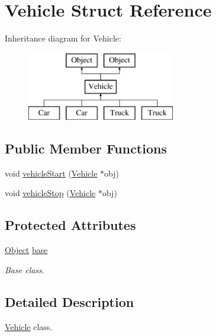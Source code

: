 \hypertarget{struct_vehicle}{}\section{Vehicle Struct Reference}
\label{struct_vehicle}
Inheritance diagram for Vehicle\+:\begin{figure}[H]
\begin{center}
\leavevmode
\includegraphics[height=3.000000cm]{struct_vehicle}
\end{center}
\end{figure}
\subsection*{Public Member Functions}
\begin{DoxyCompactItemize}
\item 
void \mbox{\hyperlink{struct_vehicle_a6891d3d28853bc3fdd075596dc6de9f8}{vehicle\+Start}} (\mbox{\hyperlink{struct_vehicle}{Vehicle}} $\ast$obj)
\item 
void \mbox{\hyperlink{struct_vehicle_a4dcbcba43792dcd673a552b14479ab77}{vehicle\+Stop}} (\mbox{\hyperlink{struct_vehicle}{Vehicle}} $\ast$obj)
\end{DoxyCompactItemize}
\subsection*{Protected Attributes}
\begin{DoxyCompactItemize}
\item 
\mbox{\label{struct_vehicle_ad7970f528d429f6fc1725173e93a77c2}} 
\mbox{\hyperlink{struct_object}{Object}} \mbox{\hyperlink{struct_vehicle_ad7970f528d429f6fc1725173e93a77c2}{base}}
\begin{DoxyCompactList}\small\item\em Base class. \end{DoxyCompactList}\end{DoxyCompactItemize}


\subsection{Detailed Description}
\mbox{\hyperlink{struct_vehicle}{Vehicle}} class. 

